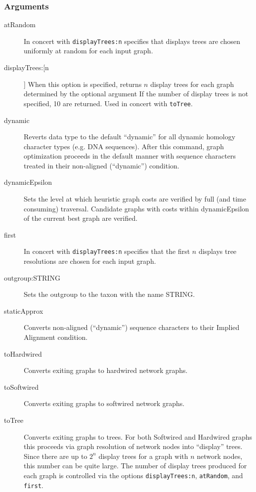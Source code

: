 	\subsubsection{Arguments}
		\begin{description}
			\item[atRandom] In concert with \texttt{displayTrees:n} specifies that displays trees are chosen 
			uniformly at random for each input graph.
			
			\item[displayTrees:[n]] When this option is specified, returns $n$ display trees for each graph 
			determined by the optional argument If the number of display trees is not 
			specified, 10 are returned. Used in concert with \texttt{toTree}.
			
			\item[dynamic] Reverts data type to the default ``dynamic'' for all dynamic homology 
			\citep{Wheeler2001} character types (e.g. DNA sequences). After this command, 
			graph optimization proceeds in the default manner with sequence characters treated 
			in their non-aligned (``dynamic'') condition.
			
			\item[dynamicEpsilon] Sets the level at which heuristic graph costs are verified by full (and time consuming) traversal.  
			Candidate graphs with costs within dynamicEpsilon of the current best graph are verified.
			
			\item[first] In concert with \texttt{displayTrees:n} specifies that the first $n$ displays tree 
			resolutions are chosen for each input graph.
			
			\item[outgroup:STRING]  Sets the outgroup to the taxon with the name STRING.
			
			\item[staticApprox] Converts non-aligned (``dynamic'') sequence characters to their Implied 
			Alignment \citep{Wheeler2003, WashburnandWheeler2020} condition.
			
			\item[toHardwired] Converts exiting graphs to hardwired network graphs.
			
			\item[toSoftwired] Converts exiting graphs to softwired network graphs.
			
			\item[toTree] Converts exiting graphs to trees. For both Softwired and Hardwired graphs 
			this proceeds via graph resolution of network nodes into ``display'' trees. Since there are up to 
			$2^n$ display trees for a graph with $n$ network nodes, this number can be quite large. 
			The number of display trees produced for each graph is controlled via the options 
			\texttt{displayTrees:n}, \texttt{atRandom}, and \texttt{first}. 
		\end{description}
			

